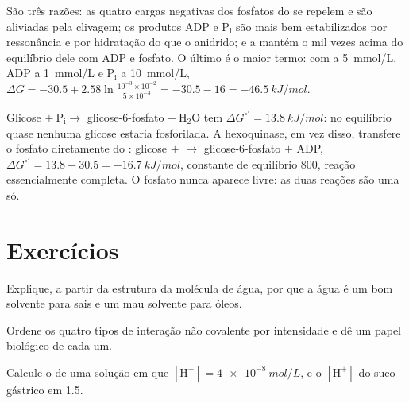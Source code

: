 \begin{example}\label{ex:b1:water-small-molecules:whyatp}
São três razões: as quatro cargas negativas dos fosfatos do  se
repelem e são aliviadas pela clivagem; os produtos $\mathrm{ADP}$ e
$\mathrm{P_i}$ são mais bem estabilizados por ressonância e por
hidratação do que o anidrido; e a  mantém o  mil vezes acima do
equilíbrio dele com ADP e fosfato. O último é o maior termo: com  a
\qty{5}{mmol/L}, ADP a \qty{1}{mmol/L} e $\mathrm{P_i}$ a
\qty{10}{mmol/L},
$\Delta G = -30.5 + 2.58\ln\frac{10^{-3}\times 10^{-2}}{5\times 10^{-3}}
= -30.5 - 16 = \qty{-46.5}{kJ/mol}$.
\end{example}

\begin{example}[Acoplamento]\label{ex:b1:water-small-molecules:coupling}
Glicose $+\ \mathrm{P_i} \to$ glicose-6-fosfato $+\ \mathrm{H_2O}$ tem
$\Delta G^{\circ\prime} = \qty{+13.8}{kJ/mol}$: no equilíbrio quase
nenhuma glicose estaria fosforilada. A hexoquinase, em vez disso,
transfere o fosfato diretamente do : glicose $+$  $\to$
glicose-6-fosfato $+$ ADP, $\Delta G^{\circ\prime} = 13.8 - 30.5 =
\qty{-16.7}{kJ/mol}$, constante de equilíbrio $800$, reação
essencialmente completa. O fosfato nunca aparece livre: as duas reações
são uma só.
\end{example}

\section{Exercícios}

\begin{exercise}[$\star$]\label{exo:b1:water-small-molecules:1}
Explique, a partir da estrutura da molécula de água, por que a água é um
bom solvente para sais e um mau solvente para óleos.
\end{exercise}

\begin{exercise}[$\star$]\label{exo:b1:water-small-molecules:2}
Ordene os quatro tipos de interação não covalente por intensidade e dê
um papel biológico de cada um.
\end{exercise}

\begin{exercise}[$\star$]\label{exo:b1:water-small-molecules:3}
Calcule o  de uma solução em que $[\mathrm{H^+}] = \qty{4e-8}{mol/L}$,
e o $[\mathrm{H^+}]$ do suco gástrico em  1.5.
\end{exercise}

